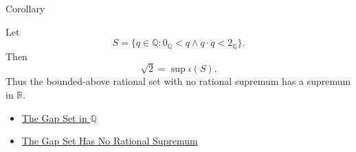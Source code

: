 \begin{corollarybox}{Corollary}
\begin{corollary}
\label{cor:r-fills-the-gap}
Let
\[
S=\{q\in\mathbb{Q}:0_{\mathbb{Q}}<q\land q\cdot q<2_{\mathbb{Q}}\}.
\]
Then
\[
\sqrt{2}=\sup \iota(S).
\]
Thus the bounded-above rational set with no rational supremum has a supremum
in $\mathbb{R}$.
\end{corollary}
\end{corollarybox}

\begin{dependencies}
\begin{itemize}
  \item \hyperref[def:gap-set-q]{The Gap Set in $\mathbb{Q}$}
  \item \hyperref[thm:gap-set-no-rational-supremum-q]{The Gap Set Has No Rational Supremum}
\end{itemize}
\end{dependencies}
